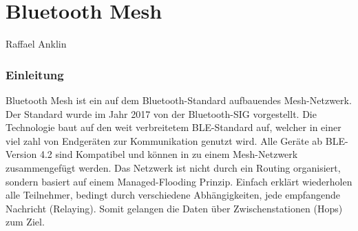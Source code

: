\vspace*{4cm}
\part{Bluetooth Mesh}\label{part:BluetoothMesh}
Raffael Anklin
\vspace*{\fill}
\clearpage

\section{Einleitung}\label{sec:EinleitungBluetooth}


Bluetooth Mesh ist ein auf dem Bluetooth-Standard aufbauendes Mesh-Netzwerk. Der Standard wurde im Jahr 2017 von der Bluetooth-SIG vorgestellt. Die Technologie baut auf den weit verbreitetem BLE-Standard auf, welcher in einer viel zahl von Endgeräten zur Kommunikation genutzt wird. Alle Geräte ab BLE-Version 4.2 sind Kompatibel und können in zu einem Mesh-Netzwerk zusammengefügt werden. Das Netzwerk ist nicht durch ein Routing organisiert, sondern basiert auf einem Managed-Flooding Prinzip. Einfach erklärt wiederholen alle Teilnehmer, bedingt durch verschiedene Abhängigkeiten, jede empfangende Nachricht (Relaying). Somit gelangen die Daten über Zwischenstationen (Hops) zum Ziel. 









